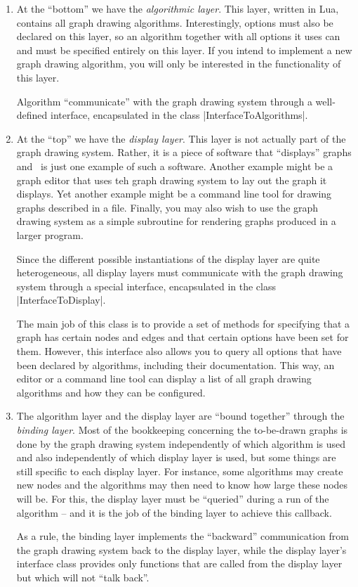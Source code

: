 \begin{enumerate}
\item At the ``bottom'' we have the \emph{algorithmic layer}. This
  layer, written in Lua, contains all graph drawing
  algorithms. Interestingly, options must also be declared on this
  layer, so an algorithm together with all options it uses can and
  must be specified entirely on this layer.
  If you intend to implement a new graph drawing algorithm, you will
  only be interested in the functionality of this layer.

  Algorithm ``communicate'' with the graph drawing system through
  a well-defined interface, encapsulated in the class
  |InterfaceToAlgorithms|.
\item At the ``top'' we have the \emph{display layer}. This layer is
  not actually part of the graph drawing system. Rather, it is a piece
  of software that ``displays'' graphs and \tikzname\ is just one
  example of such a software. Another example might be a graph
  editor that uses teh graph drawing system to lay out the graph it
  displays. Yet another example might be a command line tool for
  drawing graphs described in a file. Finally, you may also wish to
  use the graph drawing system as a simple subroutine for rendering
  graphs produced in a larger program.

  Since the different possible instantiations of the display layer are
  quite heterogeneous, all display layers must communicate with the
  graph drawing system through a special interface, encapsulated in
  the class |InterfaceToDisplay|.

  The main job of this class is to provide a set of methods for
  specifying that a graph has certain nodes and edges and that certain
  options have been set for them. However, this interface also allows
  you to query all options that have been declared by algorithms,
  including their documentation. This
  way, an editor or a command line tool can display a list of all
  graph drawing algorithms and how they can be configured.
\item
  The algorithm layer and the display layer are ``bound together''
  through the \emph{binding layer}. Most of the bookkeeping concerning
  the to-be-drawn graphs is done by the graph drawing system
  independently of which algorithm is used and also independently of
  which display layer is used, but some things are still specific to
  each display layer. For instance, some algorithms may create new
  nodes and the algorithms may then need to know how large these nodes
  will be. For this, the display layer must be ``queried'' during a
  run of the algorithm -- and it is the job of the binding layer to
  achieve this callback.
  
  As a rule, the binding layer implements the ``backward''
  communication from the graph drawing system back to the display
  layer, while the display layer's interface class provides only
  functions that are called from the display layer but which will not
  ``talk back''.
\end{enumerate}


